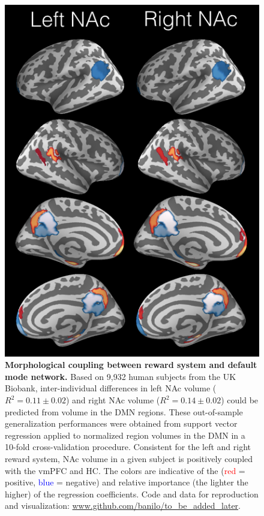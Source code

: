 \documentclass[10pt,letterpaper]{article}
\begin{document}
\begin{figure}[!htbp]
  \begin{minipage}[c]{0.63\textwidth}
    \includegraphics[width=.8\linewidth]{fig_dmn.png}
  \end{minipage}
  \hspace{-4em}
  \begin{minipage}[c]{0.45\textwidth}
    \caption{\textbf{Morphological coupling between reward system and
        default mode network.} Based on 9,932 human subjects from the UK Biobank, inter-individual differences in left NAc volume ($R^2=0.11 \pm 0.02$) and right NAc volume ($R^2=0.14 \pm 0.02$) could be predicted from volume in the DMN regions. These out-of-sample generalization performances were obtained from support vector regression applied to normalized region volumes in the DMN in a 10-fold cross-validation procedure.
      Consistent for the left and right reward system, NAc volume in a given subject is
      positively coupled with the vmPFC and HC. The colors are indicative of the (\textcolor{red}{red} = positive,
      \textcolor{blue}{blue} = negative) and relative importance (the lighter the higher) of the regression coefficients.
  Code and data for reproduction and visualization:
  \url{www.github.com/banilo/to_be_added_later}.
  }
  \label{fig:dmn}
\end{minipage}
\end{figure}
\end{document}
